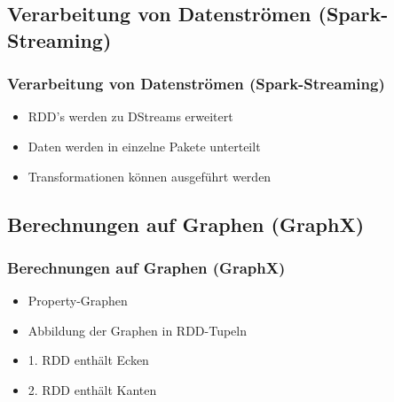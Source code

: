 \documentclass[hyperref={pdfpagelabels=false}]{beamer}
\begin{document}
\subsection{Verarbeitung von Datenströmen (Spark-Streaming)}
\begin{frame} [t]
\frametitle{Verarbeitung von Datenströmen (Spark-Streaming)}

\begin{itemize}
	\item RDD's werden zu DStreams erweitert
	\item Daten werden in einzelne Pakete unterteilt
	\item Transformationen können ausgeführt werden
\end{itemize}

 {
	\begin{figure}[h]
		\centering
	\end{figure}
}
\end{frame}


\subsection{Berechnungen auf Graphen (GraphX)}
\begin{frame} [t]
\frametitle{Berechnungen auf Graphen (GraphX)}

\begin{itemize}
	\item Property-Graphen
	\item Abbildung der Graphen in RDD-Tupeln
	\item 1. RDD enthält Ecken
	\item 2. RDD enthält Kanten	
\end{itemize}

 {
	\begin{figure}[h]
		\centering
	\end{figure}
}

\end{frame}
\end{document}
